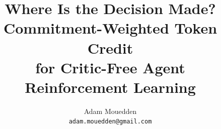\documentclass[10pt,twocolumn,letterpaper]{article}
\title{Where Is the Decision Made? Commitment-Weighted Token Credit\\for Critic-Free Agent Reinforcement Learning}
\author{Adam Mouedden\\
{\tt\small adam.mouedden@gmail.com}
}
\begin{document}
\ClearShipoutPicture\nolinenumbers  %
\toggletrue{cvprfinal}  %
\maketitle









{
    \small
    
    
}
\end{document}
